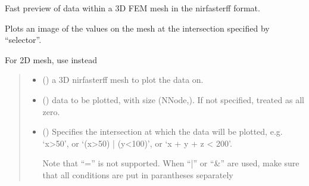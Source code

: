 \documentclass[letterpaper,10pt,english]{sphinxmanual}
\begin{document}
\begin{fulllineitems}
\label{\detokenize{_autosummary/nirfasterff.visualize.plot3dmesh:nirfasterff.visualize.plot3dmesh}}
\pysigstartsignatures
{}
\pysigstopsignatures
\sphinxAtStartPar
Fast preview of data within a 3D FEM mesh in the nirfasterff format.

\sphinxAtStartPar
Plots an image of the values on the mesh at the intersection specified by “selector”.

\sphinxAtStartPar
For 2D mesh, use {\hyperref[\detokenize{_autosummary/nirfasterff.visualize.plotimage:nirfasterff.visualize.plotimage}]{}} instead
\begin{quote}\begin{description}
\begin{itemize}
\item {} 
\sphinxAtStartPar
{} () \textendash{} a 3D nirfasterff mesh to plot the data on.

\item {} 
\sphinxAtStartPar
{} (\sphinxstyleliteralemphasis{\sphinxupquote{, }}) \textendash{} data to be plotted, with size (NNode,). If not specified, treated as all zero.

\item {} 
\sphinxAtStartPar
{} (\sphinxstyleliteralemphasis{\sphinxupquote{, }}) \textendash{} 
\sphinxAtStartPar
Specifies the intersection at which the data will be plotted, e.g. ‘x\textgreater{}50’, or ‘(x\textgreater{}50) | (y\textless{}100)’, or ‘x + y + z \textless{} 200’.

\sphinxAtStartPar
Note that “=” is not supported. When “|” or “\&” are used, make sure that all conditions are put in parantheses separately


\end{itemize}
\end{description}
\end{quote}
\end{fulllineitems}
\end{document}
